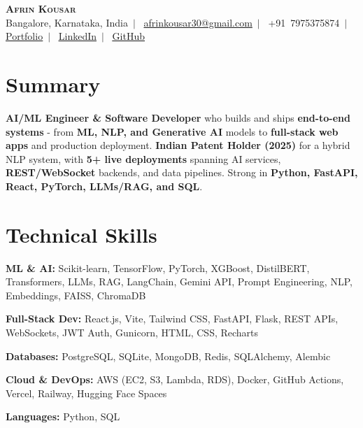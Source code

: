 \documentclass[letterpaper,9pt]{article}
\begin{document}
\begin{center}
  {\LARGE\scshape\textbf{Afrin Kousar}}\\\vspace{3pt}
  \footnotesize
  Bangalore, Karnataka, India~$|$~
  \href{mailto:afrinkousar30@gmail.com}{afrinkousar30@gmail.com}~$|$~
  +91~7975375874~$|$~
  \href{https://afrin-kousar.netlify.app/}{\underline{Portfolio}}~$|$~
  \href{https://linkedin.com/in/afrin-kousar}{\underline{LinkedIn}}~$|$~
  \href{https://github.com/afrin2315}{\underline{GitHub}}
\end{center}
\vspace{-7pt}

\section{Summary}
{\scriptsize
\textbf{AI/ML Engineer \& Software Developer} who builds and ships \textbf{end-to-end systems} - from \textbf{ML, NLP, and Generative AI} models to \textbf{full-stack web apps} and production deployment. \textbf{Indian Patent Holder (2025)} for a hybrid NLP system, with \textbf{5+ live deployments} spanning AI services, \textbf{REST/WebSocket} backends, and data pipelines. Strong in \textbf{Python, FastAPI, React, PyTorch, LLMs/RAG, and SQL}.
}

\section{Technical Skills}
\begin{itemize}[leftmargin=0.1in,label={},itemsep=1pt,topsep=2pt,parsep=0pt]
  \scriptsize{
    \item \textbf{ML \& AI:} Scikit-learn, TensorFlow, PyTorch, XGBoost, DistilBERT, Transformers, LLMs, RAG, LangChain, Gemini API, Prompt Engineering, NLP, Embeddings, FAISS, ChromaDB
    \item \textbf{Full-Stack Dev:} React.js, Vite, Tailwind CSS, FastAPI, Flask, REST APIs, WebSockets, JWT Auth, Gunicorn, HTML, CSS, Recharts
    \item \textbf{Databases:} PostgreSQL, SQLite, MongoDB, Redis, SQLAlchemy, Alembic
    \item \textbf{Cloud \& DevOps:} AWS (EC2, S3, Lambda, RDS), Docker, GitHub Actions, Vercel, Railway, Hugging Face Spaces
    \item \textbf{Languages:} Python, SQL
  }
\end{itemize}
\end{document}
